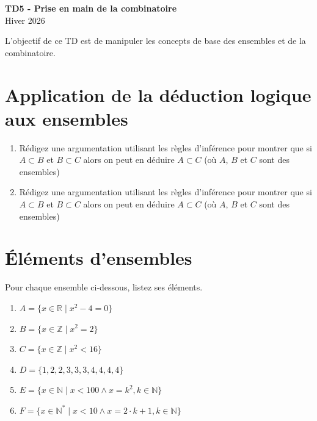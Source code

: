 \documentclass[a4paper,11pt]{article}
\begin{document}
\begin{center}
{\Huge\bfseries TD5 - Prise en main de la combinatoire} \\[0.5cm]
{\large Hiver 2026} \\[0.3cm]
\end{center}

\vspace{0.5cm}

L'objectif de ce TD est de manipuler les concepts de base des ensembles et de la combinatoire.

\section{Application de la déduction logique aux ensembles}

\begin{enumerate}
\item Rédigez une argumentation utilisant les règles d'inférence pour montrer que si $A \subset B$ et $B \subset C$ alors on peut en déduire $A \subset C$ (où $A$, $B$ et $C$ sont des ensembles)

\item Rédigez une argumentation utilisant les règles d'inférence pour montrer que si $A \subset B$ et $B \subset C$ alors on peut en déduire $A \subset C$ (où $A$, $B$ et $C$ sont des ensembles)
\end{enumerate}

\section{Éléments d'ensembles}

Pour chaque ensemble ci-dessous, listez ses éléments.

\begin{enumerate}
\item $A = \{x \in \mathbb{R} \mid x^2 - 4 = 0\}$

\item $B = \{x \in \mathbb{Z} \mid x^2 = 2\}$

\item $C = \{x \in \mathbb{Z} \mid x^2 < 16\}$

\item $D = \{1, 2, 2, 3, 3, 3, 4, 4, 4, 4\}$

\item $E = \{x \in \mathbb{N} \mid x < 100 \wedge x = k^2, k \in \mathbb{N}\}$

\item $F = \{x \in \mathbb{N}^* \mid x < 10 \wedge x = 2 \cdot k + 1, k \in \mathbb{N}\}$
\end{enumerate}
\end{document}
